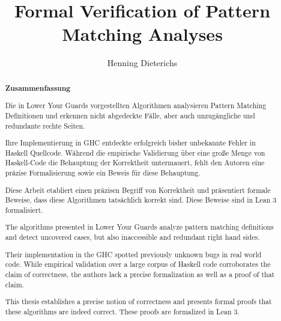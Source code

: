 \documentclass[parskip=no,12pt,a4paper,twoside,headings=openright]{scrreprt}
\title{Formal Verification of Pattern Matching Analyses}
\author{Henning Dieterichs}
\begin{document}
\begin{otherlanguage}{ngerman} %
	\mytitlepage
\end{otherlanguage}

\begin{abstract}
	\begin{center}\Huge\textbf{\textsf{Zusammenfassung}}
	\end{center}
	\vfill
    Die in Lower Your Guards vorgestellten Algorithmen analysieren Pattern Matching Definitionen
	und erkennen nicht abgedeckte Fälle, aber auch unzugängliche und redundante rechte Seiten.
	
	Ihre Implementierung in GHC entdeckte erfolgreich bisher unbekannte Fehler in Haskell Quellcode.
    Während die empirische Validierung über eine große Menge von Haskell-Code die Behauptung der Korrektheit untermauert,
    fehlt den Autoren eine präzise Formalisierung sowie ein Beweis für diese Behauptung.
	
	Diese Arbeit etabliert einen präzisen Begriff von Korrektheit und
	präsentiert formale Beweise, dass diese Algorithmen tatsächlich korrekt sind.
	Diese Beweise sind in Lean 3 formalisiert.

	\vfill

	The algorithms presented in Lower Your Guards analyze pattern matching definitions
	and detect uncovered cases, but also inaccessible and redundant right hand sides.
	
	Their implementation in the GHC spotted previously unknown bugs in real world code.
    While empirical validation over a large corpus of Haskell code corroborates the claim of correctness, the authors lack a precise formalization as well as a proof of that claim.
	
	This thesis establishes a precise notion of correctness and
	presents formal proofs that these algorithms are indeed correct.
	These proofs are formalized in Lean 3.
	\vfill

\end{abstract}

\tableofcontents










\end{document}
